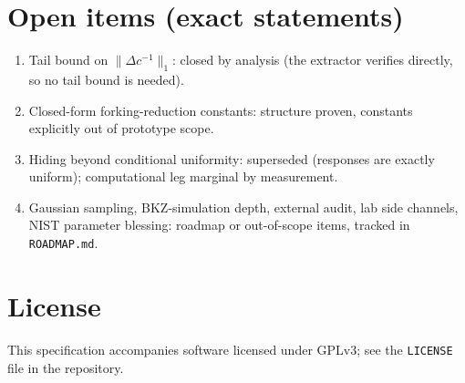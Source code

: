 \documentclass[11pt,a4paper]{article}
\theoremstyle{remark}
\begin{document}
\section{Open items (exact statements)}

\begin{enumerate}
\item Tail bound on $\lVert \Delta c^{-1}\rVert_1$: closed by analysis
  (the extractor verifies directly, so no tail bound is needed).
\item Closed-form forking-reduction constants: structure proven,
  constants explicitly out of prototype scope.
\item Hiding beyond conditional uniformity: superseded (responses are
  exactly uniform); computational leg marginal by measurement.
\item Gaussian sampling, BKZ-simulation depth, external audit, lab side
  channels, NIST parameter blessing: roadmap or out-of-scope items,
  tracked in \texttt{ROADMAP.md}.
\end{enumerate}

\section*{License}
This specification accompanies software licensed under GPLv3; see the
\texttt{LICENSE} file in the repository.
\end{document}
